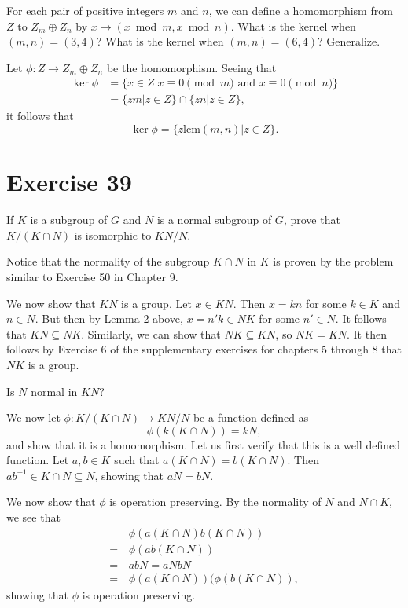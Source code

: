 \documentclass[12pt]{article}
\newcommand{\lcm}{\mbox{lcm}}
\begin{document}
For each pair of positive integers $m$ and $n$, we can define a homomorphism
from $Z$ to $Z_m\oplus Z_n$ by $x\to (x\bmod m, x\bmod n)$.  What is the
kernel when $(m,n)=(3,4)$?  What is the kernel when $(m,n)=(6,4)$?
Generalize.

Let $\phi:Z\to Z_m\oplus Z_n$ be the homomorphism.  Seeing that
\begin{align*}
\ker\phi&=\{x\in Z|\mbox{$x\equiv 0\pmod m$ and $x\equiv 0\pmod n$}\} \\
 &=\{zm|z\in Z\}\cap\{zn|z\in Z\},
\end{align*}
it follows that
\begin{equation*}
\ker\phi=\{z\lcm(m,n)|z\in Z\}.
\end{equation*}

\section*{Exercise 39}

If $K$ is a subgroup of $G$ and $N$ is a normal subgroup of $G$,
prove that $K/(K\cap N)$ is isomorphic to $KN/N$.

Notice that the normality of the subgroup $K\cap N$ in $K$ is proven
by the problem similar to Exercise 50 in Chapter 9.

We now show that $KN$ is a group.
Let $x\in KN$.  Then $x=kn$ for some $k\in K$ and $n\in N$.
But then by Lemma 2 above, $x=n'k\in NK$ for some $n'\in N$.
It follows that $KN\subseteq NK$.
Similarly, we can show that $NK\subseteq KN$, so $NK=KN$.
It then follows by Exercise 6 of the supplementary exercises
for chapters 5 through 8 that $NK$ is a group.

Is $N$ normal in $KN$?

We now let $\phi:K/(K\cap N)\to KN/N$ be a function defined as
\begin{equation*}
\phi(k(K\cap N))=kN,
\end{equation*}
and show that it is a homomorphism.  Let us first verify that this
is a well defined function.  Let $a,b\in K$ such that $a(K\cap N)=b(K\cap N)$.
Then $ab^{-1}\in K\cap N\subseteq N$, showing that $aN=bN$.

We now show that $\phi$ is operation preserving.
By the normality of $N$ and $N\cap K$, we see that
\begin{align*}
 & \phi(a(K\cap N)b(K\cap N)) \\
=\,& \phi(ab(K\cap N)) \\
 =\,& abN=aNbN \\
 =\,& \phi(a(K\cap N))(\phi(b(K\cap N)),
\end{align*}
showing that $\phi$ is operation preserving.
\end{document}

